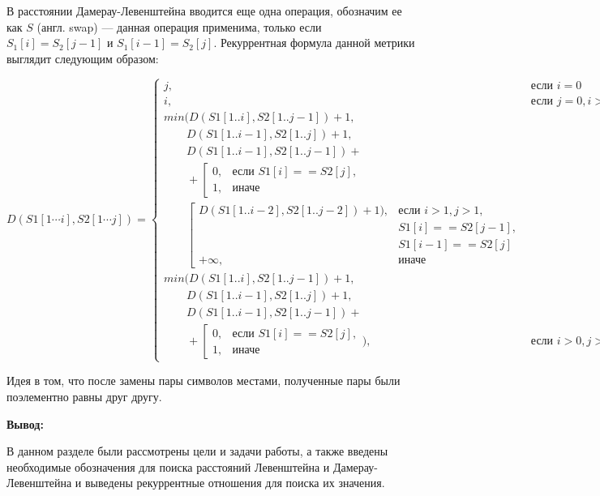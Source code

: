 В расстоянии Дамерау-Левенштейна вводится еще одна операция, обозначим ее как $S$ (англ. swap) --- данная операция применима, только  если $S_{1}[i] = S_{2}[j - 1]$
и $S_{1}[i - 1] = S_{2}[j]$. Рекуррентная формула  данной метрики выглядит следующим образом:
\begin{tiny}
\begin{equation}
	\label{eq:DL}
	D(S1[1\cdots i],S2[1 \cdots j]) = \left\{ \begin{array}{ll}
		j, & \textrm{$\mbox{если }i = 0$}\\
		i, & \textrm{$\mbox{если }j = 0, i > 1$}\\ 
		min(D(S1[1..i], S2[1.. j - 1]) + 1,\\
		\qquad D(S1[1..i - 1], S2[1..j]) + 1,\\
		\qquad D(S1[1..i - 1], S2[1..j - 1]) + \\
		\qquad+\left[ 
		\begin{array}{ccc}
			0, & \textrm{$\mbox{если }S1[i] == S2[j],$}\\
			1, & \textrm{иначе}
		\end{array} 
		\right.\\
		\qquad \left[
		\begin{array}{ccc}
			D(S1[1..i - 2], S2[1..j - 2]) + 1), & \textrm{$\mbox{если }i > 1, j > 1,$}\\
			& \textrm{$S1[i] == S2[j - 1],$}\\
			& \textrm{$S1[i - 1] == S2[j]$}\\
			+{\infty}, & \textrm{иначе}
		\end{array}
	\right.\\
		
		min(D(S1[1..i], S2[1..j - 1]) + 1,\\
		\qquad D(S1[1..i - 1], S2[1..j]) + 1, \\
		\qquad D(S1[1..i - 1], S2[1..j - 1]) + \\
		\qquad+\left[ 
		\begin{array}{ccc}
			0, & \textrm{$\mbox{если }S1[i] == S2[j],$}\\
			1, & \textrm{иначе}
		\end{array} 
		\right.), &\textrm{$\mbox{если }i>0, j>0$}
	\end{array} \right.
\end{equation}
\end{tiny}
Идея в том, что после замены пары символов местами, полученные пары были поэлементно равны друг другу.

\textbf{Вывод:}

В данном разделе были рассмотрены цели и задачи работы, а также введены необходимые обозначения для поиска расстояний Левенштейна и Дамерау-Левенштейна
и выведены рекуррентные отношения для поиска их значения.

